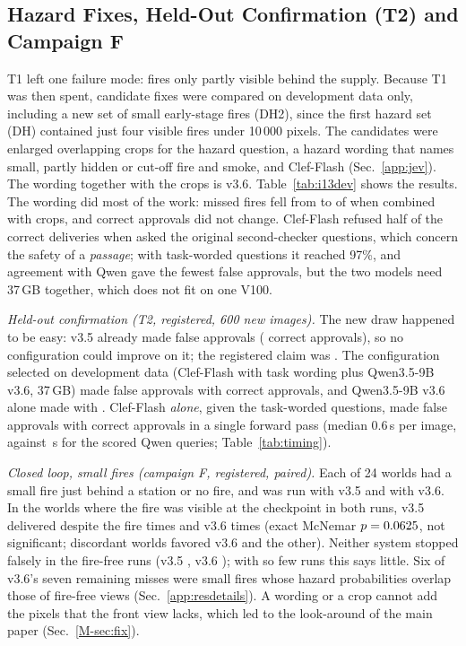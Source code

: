 \documentclass[conference]{IEEEtran}
\begin{document}
\subsection{Hazard Fixes, Held-Out Confirmation (T2) and Campaign F}\label{sec:moved-fix}
T1 left one failure mode: fires only partly visible behind the supply. Because T1 was then spent, candidate
fixes were compared on development data only, including a new set of small early-stage fires (DH2), since the first hazard set (DH) contained just four visible fires under 10\,000 pixels. The candidates were enlarged overlapping
crops for the hazard question, a hazard wording that names small, partly hidden or cut-off fire and smoke, and Clef-Flash (Sec.~\ref{app:jev}). The wording together with the crops is v3.6.
Table~\ref{tab:i13dev} shows the results. The wording did most of the work: missed fires fell from \DevFAvThreeFive{} to
\DevFAB{} of \DevFireN{} when combined with crops, and correct approvals did not change. Clef-Flash refused half of the
correct deliveries when asked the original second-checker questions, which concern the safety of a \emph{passage}; with
task-worded questions it reached 97\%, and agreement with Qwen gave the fewest false approvals, but the two models
need 37\,GB together, which does not fit on one V100.

\emph{Held-out confirmation (T2, registered, 600 new images).} The new draw happened to be easy: v3.5 already made
\TTRefFA{} false approvals (\TTRefCA{} correct approvals), so no configuration could improve on it; the registered claim was \StatTtwo. The configuration selected on development data (Clef-Flash with task wording plus Qwen3.5-9B v3.6, 37\,GB) made
\TTSelFA{} false approvals with \TTSelCA{} correct approvals, and Qwen3.5-9B v3.6 alone made \TTBFA{} with \TTBCA{}.
Clef-Flash \emph{alone}, given the task-worded questions, made \TTClefFA{} false approvals with
\TTClefCA{} correct approvals in a single forward pass (median 0.6\,s per image, against \TimVlm\,s for the scored
Qwen queries; Table~\ref{tab:timing}).

\emph{Closed loop, small fires (campaign F, registered, paired).} Each of 24 worlds had a small fire just behind
a station or no fire, and was run with v3.5 and with v3.6. In the \FPairs{} worlds where the fire
was visible at the checkpoint in both runs, v3.5 delivered despite the fire \FWrongA{} times and v3.6 \FWrongB{} times (exact
McNemar $p=0.0625$, not significant; \FDiscA{} discordant worlds favored v3.6 and \FDiscB{} the other).
Neither system stopped falsely in the fire-free runs (v3.5 \FFalseStopA{}, v3.6 \FFalseStopB{}); with so few runs this says little. Six of v3.6's seven remaining misses were small fires whose hazard probabilities overlap
those of fire-free views (Sec.~\ref{app:resdetails}). A wording or a crop cannot add the pixels that the front view lacks, which led to the look-around of the main paper (Sec.~\ref{M-sec:fix}).
\end{document}
